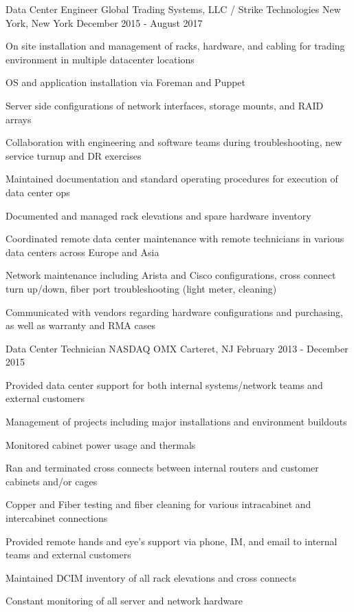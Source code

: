 \begin{cventries}
	\cventry
	{Data Center Engineer}
	{Global Trading Systems, LLC / Strike Technologies}
	{New York, New York}
	{December 2015 - August 2017}
	{
		\begin{cvitems}
		\item {On site installation and management of racks, hardware, and cabling for trading environment in multiple datacenter locations}
		\item {OS and application installation via Foreman and Puppet}
		\item {Server side configurations of network interfaces, storage mounts, and RAID arrays}
		\item {Collaboration with engineering and software teams during troubleshooting, new service turnup and DR exercises}
		\item {Maintained documentation and standard operating procedures for execution of data center ops}
		\item {Documented and managed rack elevations and spare hardware inventory}
		\item {Coordinated remote data center maintenance with remote technicians in various data centers across Europe and Asia}
		\item {Network maintenance including Arista and Cisco configurations, cross connect turn up/down, fiber port troubleshooting (light meter, cleaning)}
  		\item {Communicated with vendors regarding hardware configurations and purchasing, as well as warranty and RMA cases}
		\end{cvitems}
	}


	\cventry
	{Data Center Technician}
	{NASDAQ OMX}
	{Carteret, NJ}
	{February 2013 - December 2015}
	{
		\begin{cvitems}
		\item {Provided data center support for both internal systems/network teams and external customers}
		\item {Management of projects including major installations and environment buildouts}
  		\item {Monitored cabinet power usage and thermals}
		\item {Ran and terminated cross connects between internal routers and customer cabinets and/or cages}
		\item {Copper and Fiber testing and fiber cleaning for various intracabinet and intercabinet connections}
		\item {Provided remote hands and eye's support via phone, IM, and email to internal teams and external customers}
		\item {Maintained DCIM inventory of all rack elevations and cross connects}
		\item {Constant monitoring of all server and network hardware}
		\end{cvitems}
	}

\end{cventries}
